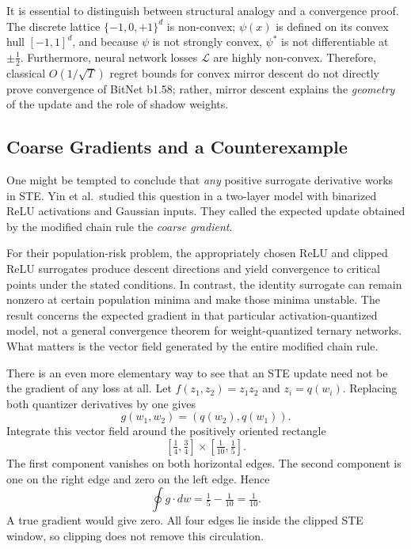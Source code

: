 \begin{remark}
It is essential to distinguish between structural analogy and a convergence proof. The discrete lattice $\{-1, 0, +1\}^d$ is non-convex; $\psi(x)$ is defined on its convex hull $[-1, 1]^d$, and because $\psi$ is not strongly convex, $\psi^*$ is not differentiable at $\pm \frac{1}{2}$. Furthermore, neural network losses $\mathcal{L}$ are highly non-convex. Therefore, classical $O(1/\sqrt{T})$ regret bounds for convex mirror descent do not directly prove convergence of BitNet b1.58; rather, mirror descent explains the \emph{geometry} of the update and the role of shadow weights.
\end{remark}

\subsection{Coarse Gradients and a Counterexample}

One might be tempted to conclude that \emph{any} positive surrogate derivative works in STE. Yin et al.\ studied this question in a two-layer model with binarized ReLU activations and Gaussian inputs. They called the expected update obtained by the modified chain rule the \emph{coarse gradient}.

For their population-risk problem, the appropriately chosen ReLU and clipped ReLU surrogates produce descent directions and yield convergence to critical points under the stated conditions. In contrast, the identity surrogate can remain nonzero at certain population minima and make those minima unstable. The result concerns the expected gradient in that particular activation-quantized model, not a general convergence theorem for weight-quantized ternary networks. What matters is the vector field generated by the entire modified chain rule.

\begin{example}
There is an even more elementary way to see that an STE update need not be the gradient of any loss at all. Let $f(z_1,z_2)=z_1z_2$ and $z_i=q(w_i)$. Replacing both quantizer derivatives by one gives
\[
     g(w_1,w_2)=(q(w_2),q(w_1)).
\]
Integrate this vector field around the positively oriented rectangle
\[
     [\tfrac14,\tfrac34]\times[\tfrac1{10},\tfrac15].
\]
The first component vanishes on both horizontal edges. The second component is one on the right edge and zero on the left edge. Hence
\[
     \oint g\cdot dw=\tfrac15-\tfrac1{10}=\tfrac1{10}.
\]
A true gradient would give zero. All four edges lie inside the clipped STE window, so clipping does not remove this circulation.
\end{example}

